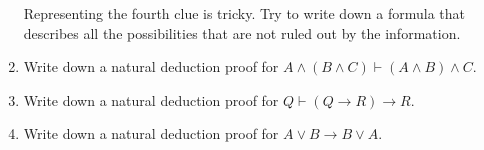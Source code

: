 \documentclass[12pt]{amsart}
\theoremstyle{definition}
\begin{document}
\begin{enumerate}
Representing the fourth clue is tricky. Try to write down a formula that
describes all the possibilities that are not ruled out by the information.

\item Write down a natural deduction proof for $A \land (B \land C) \vdash 
	(A \land B) \land C$. 

\item Write down a natural deduction proof for $Q \vdash (Q \to R) \to R$.

\item Write down a natural deduction proof for $A \lor B \to B \lor A$.

\end{enumerate}
\end{document}
